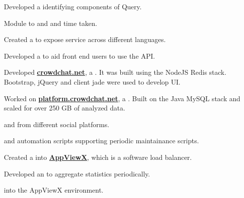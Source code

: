 \documentclass[]{bigfatnoob-resume}
\begin{document}
\begin{tightemize}
    \item Developed a  identifying components of Query.
	\item Module to  and  and time taken.
	\item Created a  to expose service across different languages.
	\item Developed a  to aid front end users to use the API.
\end{tightemize}
\sectionsep

\begin{tightemize}
	\item Developed \textbf{\href{https://www.crowdchat.net/}{crowdchat.net}}, a . It was built using the NodeJS Redis stack. Bootstrap, jQuery and client jade were used to develop UI.
	\item Worked on \textbf{\href{https://platform.crowdchat.net}{platform.crowdchat.net}}, a . Built on the Java MySQL stack and scaled for over 250 GB of analyzed data.
	\item {} and  from different social platforms.
	\item {} and automation scripts supporting periodic maintainance scripts.
\end{tightemize}
\sectionsep

\begin{tightemize}
\item Created a  into \textbf{\href{http://www.appviewx.com/}{AppViewX}}, which is a software load balancer.
\item Developed an  to aggregate statistics periodically.
\item {} into the AppViewX environment.
\end{tightemize}
\sectionsep
\end{document}
